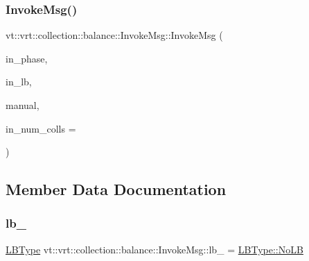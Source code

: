 \mbox{\label{structvt_1_1vrt_1_1collection_1_1balance_1_1_invoke_msg_a6c3d7dd2f1c45349a0490d05ef946333}} 
\subsubsection{\texorpdfstring{Invoke\+Msg()}{InvokeMsg()}\hspace{0.1cm}{\footnotesize\ttfamily [2/2]}}
{\footnotesize\ttfamily vt\+::vrt\+::collection\+::balance\+::\+Invoke\+Msg\+::\+Invoke\+Msg (\begin{DoxyParamCaption}\item[{\hyperlink{namespacevt_a46ce6733d5cdbd735d561b7b4029f6d7}{Phase\+Type}}]{in\+\_\+phase,  }\item[{\hyperlink{namespacevt_1_1vrt_1_1collection_1_1balance_ac4f99693509affcc67db182d4aad9b5c}{L\+B\+Type}}]{in\+\_\+lb,  }\item[{bool}]{manual,  }\item[{std\+::size\+\_\+t}]{in\+\_\+num\+\_\+colls = {} }\end{DoxyParamCaption})\hspace{0.3cm}{\ttfamily [inline]}}



\subsection{Member Data Documentation}
\mbox{\label{structvt_1_1vrt_1_1collection_1_1balance_1_1_invoke_msg_ab3bba23a78a0b6d988e64949808d3137}} 
\subsubsection{\texorpdfstring{lb\+\_\+}{lb\_}}
{\footnotesize\ttfamily \hyperlink{namespacevt_1_1vrt_1_1collection_1_1balance_ac4f99693509affcc67db182d4aad9b5c}{L\+B\+Type} vt\+::vrt\+::collection\+::balance\+::\+Invoke\+Msg\+::lb\+\_\+ = \hyperlink{namespacevt_1_1vrt_1_1collection_1_1balance_ac4f99693509affcc67db182d4aad9b5cad12268b59a4f1098aee001f9a1750020}{L\+B\+Type\+::\+No\+LB}}

